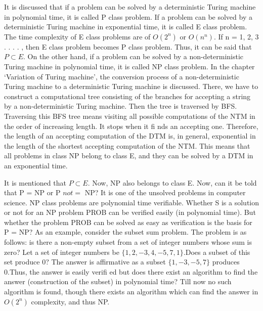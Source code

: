 \documentclass[10pt,a4paper]{book}
\begin{document}
\!\!\!\!\!\!\!\!\!It is discussed that if a problem can be solved by a deterministic Turing machine in polynomial time, it is called P class problem. If a problem can be solved by a deterministic Turing machine in exponential time, it is called E class problem. The time complexity of E class problems are of $O(2^{n})$ or $O(n^{n})$. If n = 1, 2, 3 . . . . , then E class problem becomes P class problem. Thus, it can be said that $P \subset E$. On the
other hand, if a problem can be solved by a non-deterministic Turing machine in polynomial time, it
is called NP class problem. In the chapter ‘Variation of Turing machine’, the conversion process of a
non-deterministic Turing machine to a deterministic Turing machine is discussed. There, we have to
construct a computational tree consisting of the branches for accepting a string by a non-deterministic
Turing machine. Then the tree is traversed by BFS. Traversing this BFS tree means visiting all possible
computations of the NTM in the order of increasing length. It stops when it fi nds an accepting one.
Therefore, the length of an accepting computation of the DTM is, in general, exponential in the length
of the shortest accepting computation of the NTM. This means that all problems in class NP belong to
class E, and they can be solved by a DTM in an exponential time.

It is mentioned that $P \subset E$. Now, NP also belongs to class E. Now, can it be told that P = NP or P $not=$ NP? It is one of the unsolved problems in computer science. NP class problems are polynomial time verifiable. Whether S is a solution or not for an NP problem PROB can be verified easily (in polynomial
time). But whether the problem PROB can be solved as easy as verification is the basis for P = NP? As
an example, consider the subset sum problem. The problem is as follows: is there a non-empty subset
from a set of integer numbers whose sum is zero? Let a set of integer numbers be $\{1, 2, -3, 4, -5, 7, 1\}$.Does a subset of this set produce 0? The answer is affirmative as a subset $\{1, -3, -5, 7\}$ produces 0.Thus, the answer is easily verifi ed but does there exist an algorithm to find the answer (construction of the subset) in polynomial time? Till now no such algorithm is found, though there exists an algorithm
which can find the answer in $O(2^{n})$ complexity, and thus NP.
\end{document}
